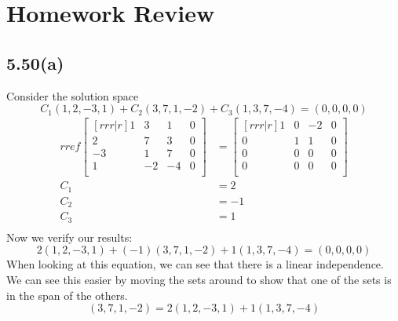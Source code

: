 \documentclass{report}
\begin{document}
\section{Homework Review}
\subsection{5.50(a)}
Consider the solution space
\[ C_1(1,2,-3,1) + C_2(3,7,1,-2)+C_3(1,3,7,-4) = (0,0,0,0) \]
\begin{align*}
rref
\begin{bmatrix}[rrr|r]
1&3&1&0\\2&7&3&0\\-3&1&7&0\\1&-2&-4&0\\ \end{bmatrix}
&= \begin{bmatrix}[rrr|r]
1&0&-2&0\\ 0&1&1&0\\0&0&0&0\\0&0&0&0\\ \end{bmatrix}\\
C_1 &= 2\\ C_2 &= -1\\ C_3 &= 1\\
\end{align*}
Now we verify our results:
\[ 2(1,2,-3,1)+(-1)(3,7,1,-2)+1(1,3,7,-4) = (0,0,0,0) \]
When looking at this equation, we can see that there is a linear independence. We can see this easier by moving the sets around to show that one of the sets is in the span of the others.
\[ (3,7,1,-2) = 2(1,2,-3,1)+1(1,3,7,-4) \]
\end{document}
